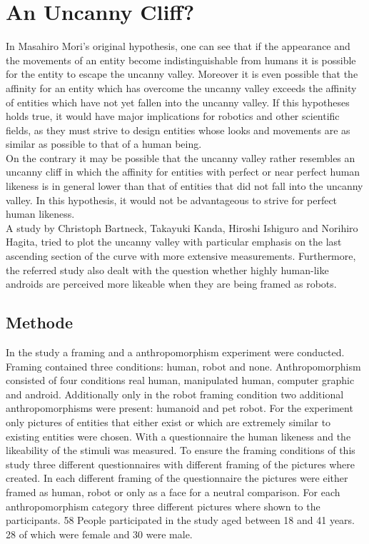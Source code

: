 \chapter{An Uncanny Cliff?}
In Masahiro Mori's original hypothesis, one can see that if the appearance and the movements of an entity become indistinguishable from humans it is possible for the entity to escape the uncanny valley. Moreover it is even possible that the affinity for an entity which has overcome the uncanny valley exceeds the affinity of entities which have not yet fallen into the uncanny valley. If this hypotheses holds true, it would have major implications for robotics and other scientific fields, as they must strive to design entities whose looks and movements are as similar as possible to that of a human being.\\
On the contrary it may be possible that the uncanny valley rather resembles an uncanny cliff in which the affinity for entities with perfect or near perfect human likeness is in general lower than that of entities that did not fall into the uncanny valley. In this hypothesis, it would not be advantageous to strive for perfect human likeness.\\
A study by Christoph Bartneck, Takayuki Kanda, Hiroshi Ishiguro and Norihiro Hagita, tried to plot the uncanny valley with particular emphasis on the last ascending section of the curve with more extensive measurements. Furthermore, the referred study also dealt with the question whether highly human-like androids are perceived more likeable when they are being framed as robots. \cite{4415111}

\section{Methode}
In the study a framing and a anthropomorphism experiment were conducted. Framing contained three conditions: human, robot and none. Anthropomorphism consisted of four conditions real human, manipulated human, computer graphic and android. Additionally only in the robot framing condition two additional anthropomorphisms were present: humanoid and pet robot. For the experiment only pictures of entities that either exist or which are extremely similar to existing entities were chosen. 
With a questionnaire the human likeness and the likeability of the stimuli was measured.
To ensure the framing conditions of this study three different questionnaires with different framing of the pictures where created. In each different framing of the questionnaire the pictures were either framed as human, robot or only as a face for a neutral comparison. For each anthropomorphism category three different pictures where shown to the participants. 
58 People participated in the study aged between 18 and 41 years. 28 of which were female and 30 were male.







